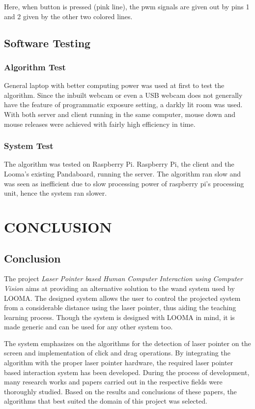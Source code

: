 \documentclass[12pt, a4paper]{article}
\begin{document}
Here, when button is pressed (pink line), the pwm signals are given out by pins 1 and 2 given by the other two colored lines. 

\subsection{Software Testing}
\subsubsection{Algorithm Test}

General laptop with better computing power was used at first to test the algorithm. Since the inbuilt webcam or even a USB webcam does not generally have the feature of programmatic exposure setting, a darkly lit room was used. With both server and client running in the same computer, mouse down and mouse releases were achieved with fairly high efficiency in time.

\subsubsection{System Test}

The algorithm was tested on Raspberry Pi. Raspberry Pi, the client and the Looma’s existing Pandaboard, running the server. The algorithm ran slow and was seen as inefficient due to slow processing power of raspberry pi's processing unit, hence the system ran slower.

\newpage

\section{CONCLUSION}
\subsection{Conclusion}
The project \emph{Laser Pointer based Human Computer Interaction using Computer Vision} aims at providing an alternative solution to the wand system used by LOOMA. The designed system allows the user to control the projected system from a considerable distance using the laser pointer, thus aiding the teaching learning process. Though the system is designed with LOOMA in mind, it is made generic and can be used for any other system too.

   The system emphasizes on the algorithms for the detection of laser pointer on the screen and implementation of click and drag operations. By integrating the algorithm with the proper laser pointer hardware, the required laser pointer based interaction system has been developed. During the process of development, many research works and papers carried out in the respective fields were thoroughly studied. Based on the results and conclusions of these papers, the algorithms that best suited the domain of this project was selected.
   
\end{document}

